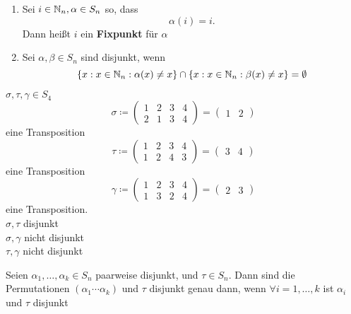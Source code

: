 \begin{subdefinition}
	\begin{enumerate}[label=(\roman*)]
		\item 
			Sei $ i \in \mathbb{N} _n, \alpha \in S_n $ so, dass \[ \alpha(i) = i . \]
			Dann heißt $ i $ ein \textbf{Fixpunkt} für $ \alpha $
		\item Sei $ \alpha, \beta \in S_n $ sind disjunkt, wenn 
			\[
				\left\{ x: x \in \mathbb{N} _n : \alpha(x) \neq x \right\} \cap \left\{ x : x \in \mathbb{N} _n : \beta(x) \neq x \right\} = \emptyset 
			\]
	\end{enumerate}
\end{subdefinition}

\begin{subexample}
	$ \sigma, \tau, \gamma \in S_4 $
	\[
		\sigma \coloneqq  \begin{pmatrix} 1 & 2 & 3 & 4\\ 2 & 1 & 3 & 4 \end{pmatrix} = \begin{pmatrix} 1 & 2 \end{pmatrix} 
	\]
	eine Transposition
	\[
		\tau \coloneqq \begin{pmatrix} 1 & 2 & 3 & 4 \\ 1 & 2 & 4 & 3 \end{pmatrix} = \begin{pmatrix} 3 & 4 \end{pmatrix} 
	\]
	eine Transposition
	\[
		\gamma \coloneqq \begin{pmatrix} 1 & 2 & 3 & 4 \\ 1 & 3 & 2 & 4 \end{pmatrix} = \begin{pmatrix} 2 & 3 \end{pmatrix} 
	\]
	eine Transposition.\\
	$ \sigma, \tau $ disjunkt\\
	$ \sigma, \gamma $ nicht disjunkt\\
	$ \tau, \gamma $ nicht disjunkt
\end{subexample}

\begin{sublemma}
	Seien $ \alpha_1, \dotsc, \alpha_k \in S_n $ paarweise disjunkt, und $ \tau \in S_n $.
	Dann sind die Permutationen $ \left( \alpha_1 \dotsb \alpha_k \right)  $ und $ \tau $ disjunkt genau dann, wenn $ \forall i = 1, \dotsc, k $ ist $ \alpha_i $ und $ \tau $ disjunkt
\end{sublemma}

